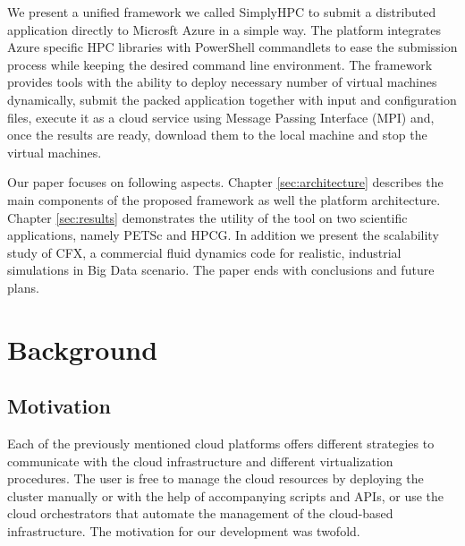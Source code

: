 \documentclass[3p,times]{elsarticle}
\begin{document}
We present a unified framework we called SimplyHPC to submit a distributed application directly to Microsft Azure in a simple way. The platform integrates Azure specific HPC libraries with PowerShell commandlets to ease the submission process while keeping the desired command line environment. The framework provides tools with the ability to deploy necessary number of virtual machines dynamically, submit the packed application together with input and configuration files, execute it as a cloud service using Message Passing Interface (MPI) and, once the results are ready, download them to the local machine and stop the virtual machines. 

Our paper focuses on following aspects. Chapter \ref{sec:architecture} describes the main components of the proposed framework as well the platform architecture. Chapter \ref{sec:results} demonstrates the utility of the tool on two scientific applications, namely PETSc and HPCG. In addition we present the scalability study of CFX, a commercial fluid dynamics code for realistic, industrial simulations in Big Data scenario. The paper ends with conclusions and future plans.




\section{Background}
\label{sec:background}
\subsection{Motivation}

Each of the previously mentioned cloud platforms offers different strategies to communicate with the cloud infrastructure and different virtualization procedures. The user is free to manage the cloud resources by deploying the cluster manually or with the help of accompanying scripts and APIs, or use the cloud orchestrators that automate the management of the cloud-based infrastructure. The motivation for our development was twofold.
\end{document}
